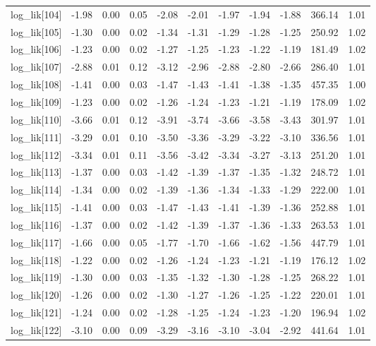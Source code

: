 \begin{table}[ht]
\begin{tabular}{rrrrrrrrrrr}
  log\_lik[104] & -1.98 & 0.00 & 0.05 & -2.08 & -2.01 & -1.97 & -1.94 & -1.88 & 366.14 & 1.01 \\ 
  log\_lik[105] & -1.30 & 0.00 & 0.02 & -1.34 & -1.31 & -1.29 & -1.28 & -1.25 & 250.92 & 1.02 \\ 
  log\_lik[106] & -1.23 & 0.00 & 0.02 & -1.27 & -1.25 & -1.23 & -1.22 & -1.19 & 181.49 & 1.02 \\ 
  log\_lik[107] & -2.88 & 0.01 & 0.12 & -3.12 & -2.96 & -2.88 & -2.80 & -2.66 & 286.40 & 1.01 \\ 
  log\_lik[108] & -1.41 & 0.00 & 0.03 & -1.47 & -1.43 & -1.41 & -1.38 & -1.35 & 457.35 & 1.00 \\ 
  log\_lik[109] & -1.23 & 0.00 & 0.02 & -1.26 & -1.24 & -1.23 & -1.21 & -1.19 & 178.09 & 1.02 \\ 
  log\_lik[110] & -3.66 & 0.01 & 0.12 & -3.91 & -3.74 & -3.66 & -3.58 & -3.43 & 301.97 & 1.01 \\ 
  log\_lik[111] & -3.29 & 0.01 & 0.10 & -3.50 & -3.36 & -3.29 & -3.22 & -3.10 & 336.56 & 1.01 \\ 
  log\_lik[112] & -3.34 & 0.01 & 0.11 & -3.56 & -3.42 & -3.34 & -3.27 & -3.13 & 251.20 & 1.01 \\ 
  log\_lik[113] & -1.37 & 0.00 & 0.03 & -1.42 & -1.39 & -1.37 & -1.35 & -1.32 & 248.72 & 1.01 \\ 
  log\_lik[114] & -1.34 & 0.00 & 0.02 & -1.39 & -1.36 & -1.34 & -1.33 & -1.29 & 222.00 & 1.01 \\ 
  log\_lik[115] & -1.41 & 0.00 & 0.03 & -1.47 & -1.43 & -1.41 & -1.39 & -1.36 & 252.88 & 1.01 \\ 
  log\_lik[116] & -1.37 & 0.00 & 0.02 & -1.42 & -1.39 & -1.37 & -1.36 & -1.33 & 263.53 & 1.01 \\ 
  log\_lik[117] & -1.66 & 0.00 & 0.05 & -1.77 & -1.70 & -1.66 & -1.62 & -1.56 & 447.79 & 1.01 \\ 
  log\_lik[118] & -1.22 & 0.00 & 0.02 & -1.26 & -1.24 & -1.23 & -1.21 & -1.19 & 176.12 & 1.02 \\ 
  log\_lik[119] & -1.30 & 0.00 & 0.03 & -1.35 & -1.32 & -1.30 & -1.28 & -1.25 & 268.22 & 1.01 \\ 
  log\_lik[120] & -1.26 & 0.00 & 0.02 & -1.30 & -1.27 & -1.26 & -1.25 & -1.22 & 220.01 & 1.01 \\ 
  log\_lik[121] & -1.24 & 0.00 & 0.02 & -1.28 & -1.25 & -1.24 & -1.23 & -1.20 & 196.94 & 1.02 \\ 
  log\_lik[122] & -3.10 & 0.00 & 0.09 & -3.29 & -3.16 & -3.10 & -3.04 & -2.92 & 441.64 & 1.01 \\ 

\end{tabular}
\end{table}
